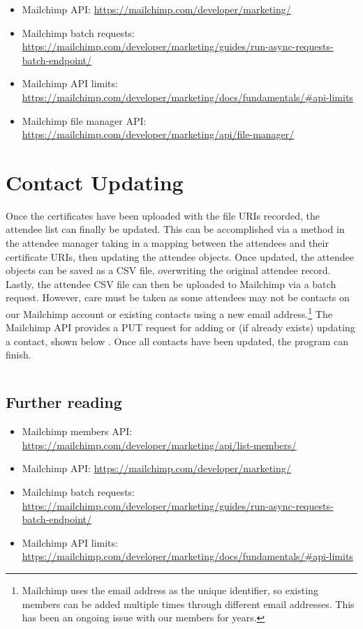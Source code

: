 \documentclass[11pt]{article}
\begin{document}
\begin{itemize}
    \item Mailchimp API: \url{https://mailchimp.com/developer/marketing/}
    \item Mailchimp batch requests: \url{https://mailchimp.com/developer/marketing/guides/run-async-requests-batch-endpoint/}
    \item Mailchimp API limits: \url{https://mailchimp.com/developer/marketing/docs/fundamentals/#api-limits}
    \item Mailchimp file manager API: \url{https://mailchimp.com/developer/marketing/api/file-manager/}
\end{itemize}

\newpage

\section{Contact Updating}

Once the certificates have been uploaded with the file URIs recorded, the attendee list can finally be updated. This can be accomplished via a method in the attendee manager taking in a mapping between the attendees and their certificate URIs, then updating the attendee objects. Once updated, the attendee objects can be saved as a CSV file, overwriting the original attendee record. Lastly, the attendee CSV file can then be uploaded to Mailchimp via a batch request. However, care must be taken as some attendees may not be contacts on our Mailchimp account or existing contacts using a new email address.\footnote{Mailchimp uses the email address as the unique identifier, so existing members can be added multiple times through different email addresses. This has been an ongoing issue with our members for years.} The Mailchimp API provides a PUT request for adding or (if already exists) updating a contact, shown below \cite{mailchimp-update-member}. Once all contacts have been updated, the program can finish.

\inputminted[linenos=true]{python}{mailchimp_examples/add_or_update_member.py}

\subsection{Further reading}

\begin{itemize}
    \item Mailchimp members API: \url{https://mailchimp.com/developer/marketing/api/list-members/}
    \item Mailchimp API: \url{https://mailchimp.com/developer/marketing/}
    \item Mailchimp batch requests: \url{https://mailchimp.com/developer/marketing/guides/run-async-requests-batch-endpoint/}
    \item Mailchimp API limits: \url{https://mailchimp.com/developer/marketing/docs/fundamentals/#api-limits}
\end{itemize}
\end{document}
